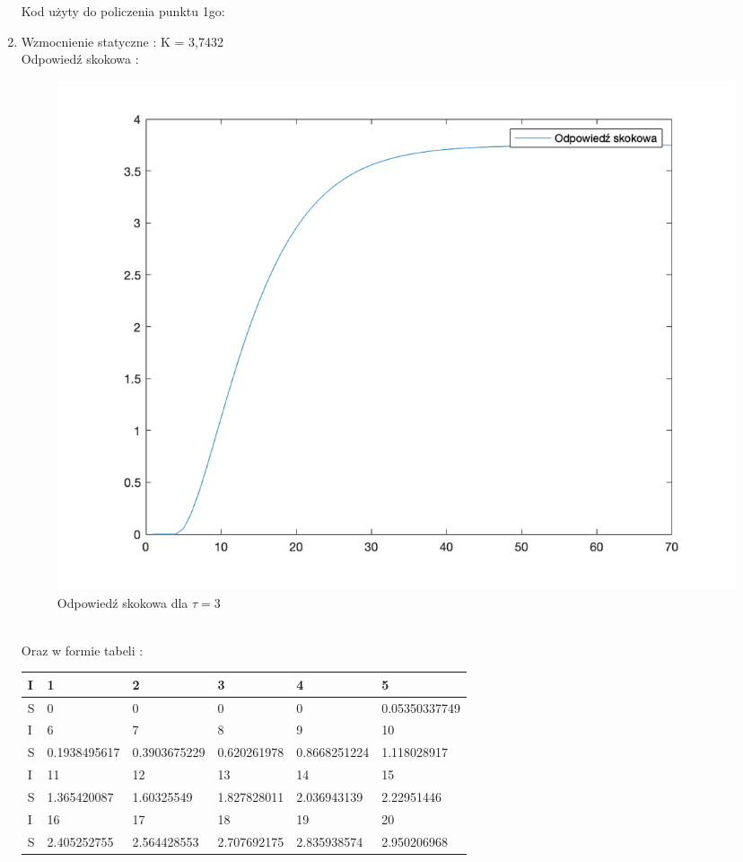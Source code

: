 \documentclass[a4paper, 11pt]{article}
\begin{document}
\begin{enumerate}
Kod użyty do policzenia punktu 1go:
  
\newpage
\item
Wzmocnienie statyczne : K = 3,7432 \\
Odpowiedź skokowa :
\begin{figure}[h]
\centering
\includegraphics[width=\linewidth]{./OdpSkokowa.png}
\caption[Odpowiedź skokowa dla \(\tau = 3\) ]
{Odpowiedź skokowa dla \(\tau = 3\) }
\end{figure}
\\
Oraz w formie tabeli : \\
\newpage
 \begin{table}[h]
\begin{tabular}{|l|l|l|l|l|l|}
\hline
I & 1            & 2            & 3           & 4            & 5             \\
\hline
S & 0            & 0            & 0           & 0            & 0.05350337749 \\
\hline
\hline
I & 6            & 7            & 8           & 9            & 10            \\
\hline
S & 0.1938495617 & 0.3903675229 & 0.620261978 & 0.8668251224 & 1.118028917   \\
\hline
\hline
I & 11           & 12           & 13          & 14           & 15            \\
\hline
S & 1.365420087  & 1.60325549   & 1.827828011 & 2.036943139  & 2.22951446    \\
\hline
\hline
I & 16           & 17           & 18          & 19           & 20            \\
\hline
S & 2.405252755  & 2.564428553  & 2.707692175 & 2.835938574  & 2.950206968   \\

\end{tabular}
\end{table}
\end{enumerate}
\end{document}
